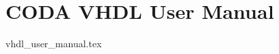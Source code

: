 \documentclass[a4paper,10pt]{report}
\begin{document}
\chapter{CODA VHDL User Manual}
\label{cha:coda-vhdl-user}

{vhdl_user_manual.tex}
\end{document}
